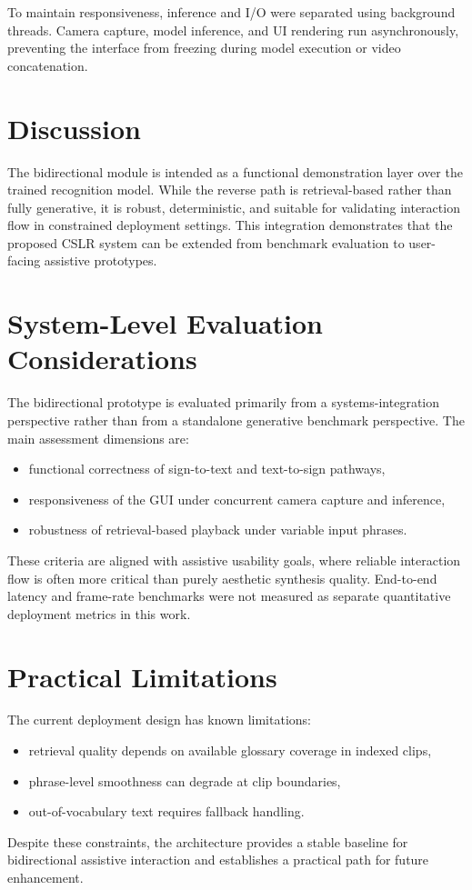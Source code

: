 To maintain responsiveness, inference and I/O were separated using background threads. Camera capture, model inference, and UI rendering run asynchronously, preventing the interface from freezing during model execution or video concatenation.

\section{Discussion}

The bidirectional module is intended as a functional demonstration layer over the trained recognition model. While the reverse path is retrieval-based rather than fully generative, it is robust, deterministic, and suitable for validating interaction flow in constrained deployment settings. This integration demonstrates that the proposed CSLR system can be extended from benchmark evaluation to user-facing assistive prototypes.

\section{System-Level Evaluation Considerations}

The bidirectional prototype is evaluated primarily from a systems-integration perspective rather than from a standalone generative benchmark perspective. The main assessment dimensions are:
\begin{itemize}
    \item functional correctness of sign-to-text and text-to-sign pathways,
    \item responsiveness of the GUI under concurrent camera capture and inference,
    \item robustness of retrieval-based playback under variable input phrases.
\end{itemize}

These criteria are aligned with assistive usability goals, where reliable interaction flow is often more critical than purely aesthetic synthesis quality. End-to-end latency and frame-rate benchmarks were not measured as separate quantitative deployment metrics in this work.

\section{Practical Limitations}

The current deployment design has known limitations:
\begin{itemize}
    \item retrieval quality depends on available glossary coverage in indexed clips,
    \item phrase-level smoothness can degrade at clip boundaries,
    \item out-of-vocabulary text requires fallback handling.
\end{itemize}

Despite these constraints, the architecture provides a stable baseline for bidirectional assistive interaction and establishes a practical path for future enhancement.
